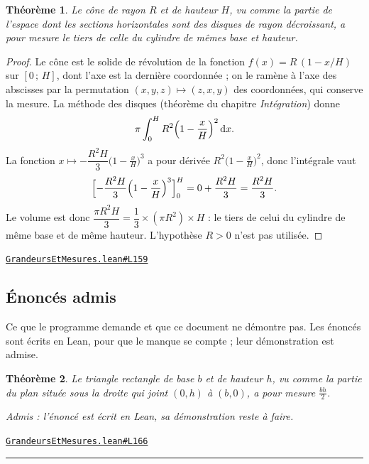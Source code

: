 \documentclass[11pt,a4paper]{article}
\theoremstyle{definition}
\theoremstyle{plain}
\newtheorem{theoreme}{Théorème}
\newcommand{\admis}{\par\smallskip\noindent\textit{Admis : l'énoncé est écrit en Lean, sa démonstration reste à faire.}\par}
\newcommand{\source}[2]{\par\smallskip\noindent\hfill{\footnotesize\href{#1}{\texttt{#2}}}\par\smallskip}
\begin{document}
\begin{theoreme}
Le cône de rayon $R$ et de hauteur $H$, vu comme la partie de l'espace dont les sections
horizontales sont des disques de rayon décroissant, a pour mesure le tiers de celle du
cylindre de mêmes base et hauteur.
\end{theoreme}
\begin{proof}
Le cône est le solide de révolution de la fonction $f(x) = R\,(1 - x/H)$ sur $[0\,;\,H]$, dont
l'axe est la dernière coordonnée ; on le ramène à l'axe des abscisses par la permutation
$(x, y, z) \mapsto (z, x, y)$ des coordonnées, qui conserve la mesure. La méthode des disques
(théorème du chapitre \emph{Intégration}) donne
\[ \pi \int_0^H R^2 \Bigl(1 - \frac{x}{H}\Bigr)^2 \,\mathrm{d}x . \]
La fonction $x \mapsto -\dfrac{R^2 H}{3}\bigl(1 - \tfrac{x}{H}\bigr)^3$ a pour dérivée
$R^2\bigl(1 - \tfrac{x}{H}\bigr)^2$, donc l'intégrale vaut
\[ \Bigl[-\frac{R^2 H}{3}\Bigl(1 - \frac{x}{H}\Bigr)^3\Bigr]_0^H
   = 0 + \frac{R^2 H}{3} = \frac{R^2 H}{3} . \]
Le volume est donc $\dfrac{\pi R^2 H}{3} = \dfrac13 \times (\pi R^2) \times H$ : le tiers de
celui du cylindre de même base et de même hauteur. L'hypothèse $R > 0$ n'est pas utilisée.
\end{proof}
\source{https://github.com/Commutator-IO/learn-lean/blob/main/courses/01-college/04-grandeurs-et-mesures/GrandeursEtMesures.lean\#L159}{GrandeursEtMesures.lean\#L159}

\vfill
\subsection{Énoncés admis}

\noindent
Ce que le programme demande et que ce document ne démontre pas. Les énoncés sont écrits en Lean, pour que le manque se compte ; leur démonstration est admise.

\begin{theoreme}
Le triangle rectangle de base $b$ et de hauteur $h$, vu comme la partie du plan située
sous la droite qui joint $(0, h)$ à $(b, 0)$, a pour mesure $\tfrac{bh}{2}$.
\end{theoreme}
\admis
\source{https://github.com/Commutator-IO/learn-lean/blob/main/courses/01-college/04-grandeurs-et-mesures/GrandeursEtMesures.lean\#L166}{GrandeursEtMesures.lean\#L166}

\noindent\rule{0.35\linewidth}{0.4pt}\par
{}
\end{document}
